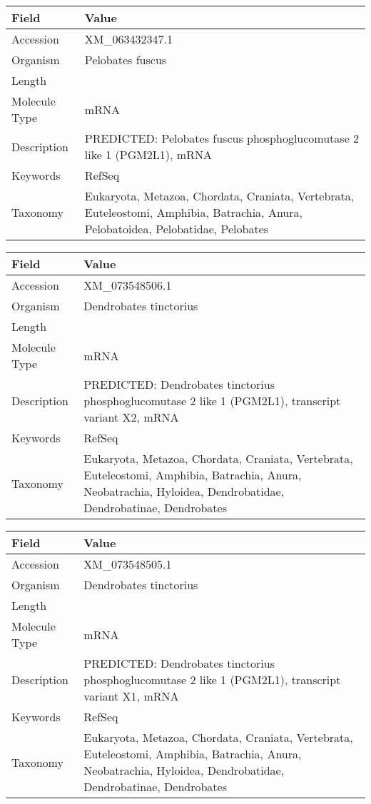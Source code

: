 \documentclass[10pt]{article}
\begin{document}
{\footnotesize
\begin{longtable}{>{\raggedright\arraybackslash}p{4.5cm} >{\raggedright\arraybackslash}p{11.5cm}}
\textbf{Field} & \textbf{Value} \\
\hline
Accession & XM\_063432347.1 \\
Organism & Pelobates fuscus \\
Length & 2355 \\
Molecule Type & mRNA \\
Description & PREDICTED: Pelobates fuscus phosphoglucomutase 2 like 1 (PGM2L1), mRNA \\
Keywords & RefSeq \\
Taxonomy & Eukaryota, Metazoa, Chordata, Craniata, Vertebrata, Euteleostomi, Amphibia, Batrachia, Anura, Pelobatoidea, Pelobatidae, Pelobates \\
\end{longtable}
}

{\footnotesize
\begin{longtable}{>{\raggedright\arraybackslash}p{4.5cm} >{\raggedright\arraybackslash}p{11.5cm}}
\textbf{Field} & \textbf{Value} \\
\hline
Accession & XM\_073548506.1 \\
Organism & Dendrobates tinctorius \\
Length & 6449 \\
Molecule Type & mRNA \\
Description & PREDICTED: Dendrobates tinctorius phosphoglucomutase 2 like 1 (PGM2L1), transcript variant X2, mRNA \\
Keywords & RefSeq \\
Taxonomy & Eukaryota, Metazoa, Chordata, Craniata, Vertebrata, Euteleostomi, Amphibia, Batrachia, Anura, Neobatrachia, Hyloidea, Dendrobatidae, Dendrobatinae, Dendrobates \\
\end{longtable}
}

{\footnotesize
\begin{longtable}{>{\raggedright\arraybackslash}p{4.5cm} >{\raggedright\arraybackslash}p{11.5cm}}
\textbf{Field} & \textbf{Value} \\
\hline
Accession & XM\_073548505.1 \\
Organism & Dendrobates tinctorius \\
Length & 6508 \\
Molecule Type & mRNA \\
Description & PREDICTED: Dendrobates tinctorius phosphoglucomutase 2 like 1 (PGM2L1), transcript variant X1, mRNA \\
Keywords & RefSeq \\
Taxonomy & Eukaryota, Metazoa, Chordata, Craniata, Vertebrata, Euteleostomi, Amphibia, Batrachia, Anura, Neobatrachia, Hyloidea, Dendrobatidae, Dendrobatinae, Dendrobates \\
\end{longtable}
}
\end{document}
